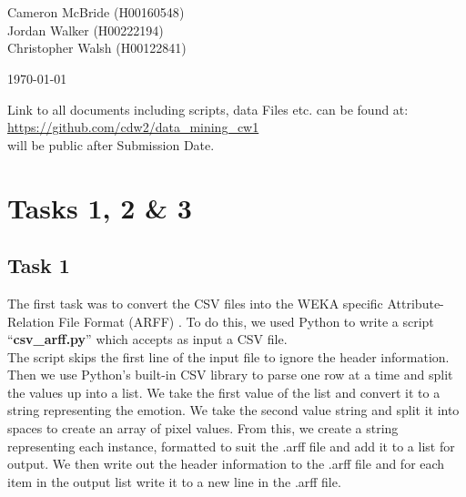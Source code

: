 \documentclass[12pt]{article}
\def \projectTitle {F20DL Data Mining \& Machine Learning}
\def \projectSubtitle {Coursework 1}
\def \authorOne {Cameron McBride}
\def \authorOneID {H00160548}
\def \authorTwo{Jordan Walker}
\def \authorTwoID {H00222194}
\def \authorThree{Christopher Walsh}
\def \authorThreeID {H00122841}
\begin{document}
\begin{titlepage}
\begin{center}
		\vspace*{3cm}
		{\Huge \color{blue}{\projectTitle}}\\[4mm]
		{\huge \color{grey}{\projectSubtitle}}\\[2cm]
		
		{\Large {\authorOne} ({\authorOneID})}\\[4mm]
		{\Large {\authorTwo} ({\authorTwoID})}\\[4mm]
		{\Large {\authorThree} ({\authorThreeID})}\\[4mm]
		
		\vspace{6cm}
		
		{\large \color{grey}{Date:}}
		{\large \today}
		
		\vspace{2cm}
		
		Link to all documents including scripts, data Files etc. can be found at: 
		\href{https://github.com/cdw2/data_mining_cw1}{https://github.com/cdw2/data\_mining\_cw1}\\
		
		{\color{grey} \footnotesize *will be public after Submission Date. }
		
		\vspace{3cm}
\end{center}
\end{titlepage}

\section{Tasks 1, 2 \& 3}

\subsection{Task 1}


The first task was to convert the CSV files into the WEKA specific Attribute-Relation File Format (ARFF) \cite{wakito2008}. To do this, we used Python to write a script ``\textbf{csv\_arff.py}'' which accepts as input a CSV file.\\

The script skips the first line of the input file to ignore the header information. Then we use Python's built-in CSV library to parse one row at a time and split the values up into a list. We take the first value of the list and convert it to a string representing the emotion. We take the second value string and split it into spaces to create an array of pixel values. From this, we create a string representing each instance, formatted to suit the .arff file and add it to a list for output. We then write out the header information to the .arff file and for each item in the output list write it to a new line in the .arff file.
\end{document}
